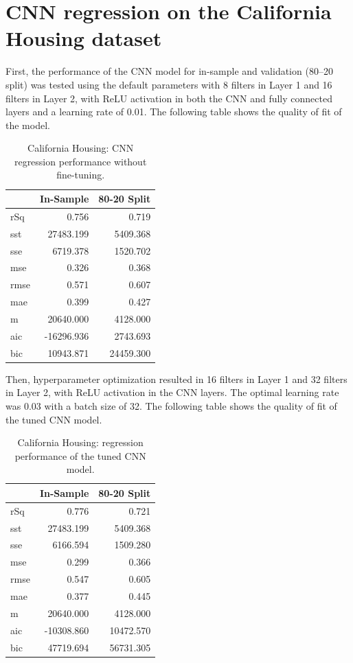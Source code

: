 \documentclass[11pt]{article}
\begin{document}
\section*{CNN regression on the California Housing dataset}
First, the performance of the CNN model for in-sample and validation (80–20 split) was tested using the default parameters with 8 filters in Layer 1 and 16 filters in Layer 2, with ReLU activation in both the CNN and fully connected layers and a learning rate of 0.01. The following table shows the quality of fit of the model.
\begin{table}[H]
\centering
\caption{California Housing: CNN regression performance without fine-tuning.}
\label{tab:California_Housing_(In-Sample)}
\begin{tabular}{lrr}
\toprule
 & In-Sample & 80-20 Split \\
\midrule
rSq & 0.756 & 0.719 \\
sst & 27483.199 & 5409.368 \\
sse & 6719.378 & 1520.702 \\
mse & 0.326 & 0.368 \\
rmse & 0.571 & 0.607 \\
mae & 0.399 & 0.427 \\
m & 20640.000 & 4128.000 \\
aic & -16296.936 & 2743.693 \\
bic & 10943.871 & 24459.300 \\
\bottomrule
\end{tabular}
\end{table}

Then, hyperparameter optimization resulted in 16 filters in Layer 1 and 32 filters in Layer 2, with ReLU activation in the CNN layers. The optimal learning rate was 0.03 with a batch size of 32. The following table shows the quality of fit of the tuned CNN model.

\begin{table}[H]
\centering
\caption{California Housing: regression performance of the tuned CNN model.}
\label{tab:California_Housing_(In-Sample)}
\begin{tabular}{lrr}
\toprule
 & In-Sample & 80-20 Split \\
\midrule
rSq & 0.776 & 0.721 \\
sst & 27483.199 & 5409.368 \\
sse & 6166.594 & 1509.280 \\
mse & 0.299 & 0.366 \\
rmse & 0.547 & 0.605 \\
mae & 0.377 & 0.445 \\
m & 20640.000 & 4128.000 \\
aic & -10308.860 & 10472.570 \\
bic & 47719.694 & 56731.305 \\
\bottomrule
\end{tabular}
\end{table}
\end{document}
